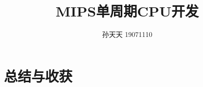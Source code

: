 \documentclass[scheme = chinese]{ctexart}
\begin{document}
\title{MIPS单周期CPU开发}
\author{孙天天 19071110}


\tableofcontents
\clearpage

\maketitle


\clearpage

\clearpage

\clearpage

\section{总结与收获}
\end{document}
